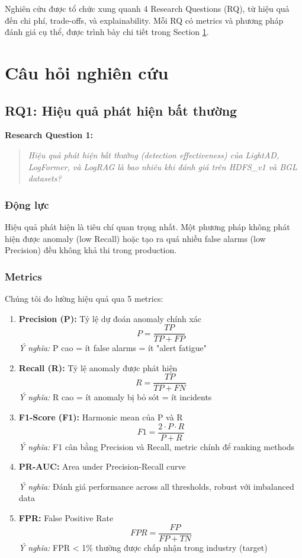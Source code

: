 Nghiên cứu được tổ chức xung quanh 4 Research Questions (RQ), từ hiệu quả đến chi phí, trade-offs, và explainability. Mỗi RQ có metrics và phương pháp đánh giá cụ thể, được trình bày chi tiết trong Section \ref{sec:research-questions}.

\section{Câu hỏi nghiên cứu}
\label{sec:research-questions}

\subsection{RQ1: Hiệu quả phát hiện bất thường}
\label{subsec:rq1}

\textbf{Research Question 1:}

\begin{quote}
\textit{Hiệu quả phát hiện bất thường (detection effectiveness) của LightAD, LogFormer, và LogRAG là bao nhiêu khi đánh giá trên HDFS\_v1 và BGL datasets?}
\end{quote}

\subsubsection{Động lực}

Hiệu quả phát hiện là tiêu chí quan trọng nhất. Một phương pháp không phát hiện được anomaly (low Recall) hoặc tạo ra quá nhiều false alarms (low Precision) đều không khả thi trong production.

\subsubsection{Metrics}

Chúng tôi đo lường hiệu quả qua 5 metrics:

\begin{enumerate}
    \item \textbf{Precision (P):} Tỷ lệ dự đoán anomaly chính xác
    \[
    P = \frac{TP}{TP + FP}
    \]
    \textit{Ý nghĩa:} P cao = ít false alarms = ít "alert fatigue"
    
    \item \textbf{Recall (R):} Tỷ lệ anomaly được phát hiện
    \[
    R = \frac{TP}{TP + FN}
    \]
    \textit{Ý nghĩa:} R cao = ít anomaly bị bỏ sót = ít incidents
    
    \item \textbf{F1-Score (F1):} Harmonic mean của P và R
    \[
    F1 = \frac{2 \cdot P \cdot R}{P + R}
    \]
    \textit{Ý nghĩa:} F1 cân bằng Precision và Recall, metric chính để ranking methods
    
    \item \textbf{PR-AUC:} Area under Precision-Recall curve
    
    \textit{Ý nghĩa:} Đánh giá performance across all thresholds, robust với imbalanced data
    
    \item \textbf{FPR:} False Positive Rate
    \[
    FPR = \frac{FP}{FP + TN}
    \]
    \textit{Ý nghĩa:} FPR < 1\% thường được chấp nhận trong industry (target)
\end{enumerate}

